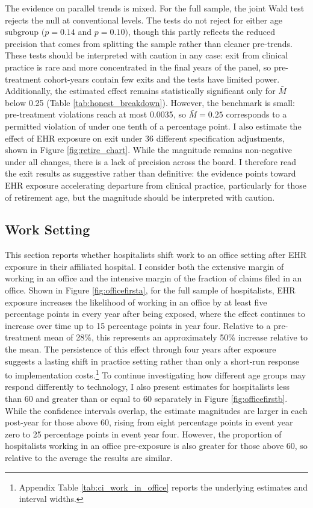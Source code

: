 \documentclass[12pt]{article}
\begin{document}
The evidence on parallel trends is mixed. For the full sample, the joint Wald test rejects the null at conventional levels. The tests do not reject for either age subgroup $(p=0.14$ and $p=0.10)$, though this partly reflects the reduced precision that comes from splitting the sample rather than cleaner pre-trends. These tests should be interpreted with caution in any case: exit from clinical practice is rare and more concentrated in the final years of the panel, so pre-treatment cohort-years contain few exits and the tests have limited power. Additionally, the estimated effect remains statistically significant only for $\bar{M}$ below 0.25 (Table \ref{tab:honest_breakdown}). However, the benchmark is small: pre-treatment violations reach at most 0.0035, so $\bar{M} = 0.25$ corresponds to a permitted violation of under one tenth of a percentage point. I also estimate the effect of EHR exposure on exit under 36 different specification adjustments, shown in Figure \ref{fig:retire_chart}. While the magnitude remains non-negative under all changes, there is a lack of precision across the board. I therefore read the exit results as suggestive rather than definitive: the evidence points toward EHR exposure accelerating departure from clinical practice, particularly for those of retirement age, but the magnitude should be interpreted with caution.


\subsection{Work Setting}\label{sec:office}

This section reports whether hospitalists shift work to an office setting after EHR exposure in their affiliated hospital. I consider both the extensive margin of working in an office and the intensive margin of the fraction of claims filed in an office. Shown in Figure \ref{fig:officefirsta}, for the full sample of hospitalists, EHR exposure increases the likelihood of working in an office by at least five percentage points in every year after being exposed, where the effect continues to increase over time up to 15 percentage points in year four. Relative to a pre-treatment mean of 28\%, this represents an approximately 50\% increase relative to the mean. The persistence of this effect through four years after exposure suggests a lasting shift in practice setting rather than only a short-run response to implementation costs.\footnote{Appendix Table \ref{tab:ci_work_in_office} reports the underlying estimates and interval widths.} To continue investigating how different age groups may respond differently to technology, I also present estimates for hospitalists less than 60 and greater than or equal to 60 separately in Figure \ref{fig:officefirstb}. While the confidence intervals overlap, the estimate magnitudes are larger in each post-year for those above 60, rising from eight percentage points in event year zero to 25 percentage points in event year four. However, the proportion of hospitalists working in an office pre-exposure is also greater for those above 60, so relative to the average the results are similar.
\end{document}
